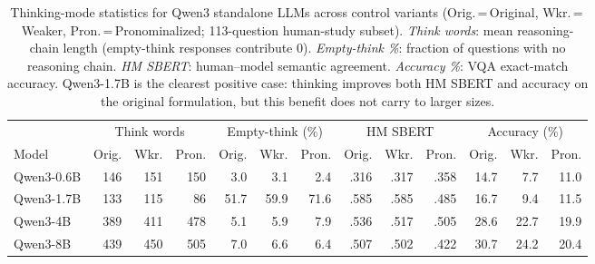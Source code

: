 \begin{table}[ht]
\centering
\small
\setlength{\tabcolsep}{3pt}

\caption{Thinking-mode statistics for Qwen3 standalone LLMs across control variants
(Orig.\,=\,Original, Wkr.\,=\,Weaker, Pron.\,=\,Pronominalized; 113-question human-study subset).
\textit{Think words}: mean reasoning-chain length (empty-think responses contribute 0).
\textit{Empty-think \%}: fraction of questions with no reasoning chain.
\textit{HM SBERT}: human--model semantic agreement.
\textit{Accuracy \%}: VQA exact-match accuracy.
Qwen3-1.7B is the clearest positive case: thinking improves both HM SBERT and accuracy on the original formulation, but this benefit does not carry to larger sizes.}
\label{tab:think_stats}
\begin{tabular}{l rrr | rrr | rrr | rrr}
\toprule
 & \multicolumn{3}{c|}{Think words} & \multicolumn{3}{c|}{Empty-think (\%)} & \multicolumn{3}{c|}{HM SBERT} & \multicolumn{3}{c}{Accuracy (\%)} \\
\cmidrule(lr){2-4}\cmidrule(lr){5-7}\cmidrule(lr){8-10}\cmidrule(l){11-13}
Model & Orig. & Wkr. & Pron. & Orig. & Wkr. & Pron. & Orig. & Wkr. & Pron. & Orig. & Wkr. & Pron. \\
\midrule
Qwen3-0.6B & 146 & 151 & 150 &  3.0 &  3.1 &  2.4 & .316 & .317 & .358 & 14.7 &  7.7 & 11.0 \\
Qwen3-1.7B & 133 & 115 &  86 & 51.7 & 59.9 & 71.6 & .585 & .585 & .485 & 16.7 &  9.4 & 11.5 \\
Qwen3-4B   & 389 & 411 & 478 &  5.1 &  5.9 &  7.9 & .536 & .517 & .505 & 28.6 & 22.7 & 19.9 \\
Qwen3-8B   & 439 & 450 & 505 &  7.0 &  6.6 &  6.4 & .507 & .502 & .422 & 30.7 & 24.2 & 20.4 \\
\bottomrule
\end{tabular}
\end{table}
